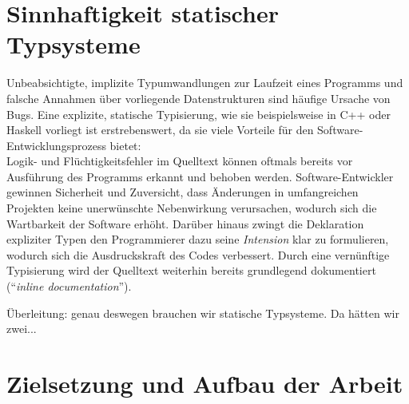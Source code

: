 


\section{Sinnhaftigkeit statischer Typsysteme}

Unbeabsichtigte, implizite Typumwandlungen zur Laufzeit eines Programms und falsche Annahmen über vorliegende Datenstrukturen sind häufige Ursache von Bugs. Eine explizite, statische Typisierung, wie sie beispielsweise in C++ oder Haskell vorliegt ist erstrebenswert, da sie viele Vorteile für den Software-Entwicklungsprozess bietet:\\
Logik- und Flüchtigkeitsfehler im Quelltext können oftmals bereits vor Ausführung des Programms erkannt und behoben werden. Software-Entwickler gewinnen Sicherheit und Zuversicht, dass Änderungen in umfangreichen Projekten keine unerwünschte Nebenwirkung verursachen, wodurch sich die Wartbarkeit der Software erhöht. Darüber hinaus zwingt die Deklaration expliziter Typen den Programmierer dazu seine \emph{Intension} klar zu formulieren, wodurch sich die Ausdruckskraft des Codes verbessert. Durch eine vernünftige Typisierung wird der Quelltext weiterhin bereits grundlegend dokumentiert (\enquote{\textit{inline documentation}}).


Überleitung: genau deswegen brauchen wir statische Typsysteme. Da hätten wir zwei...

\section{Zielsetzung und Aufbau der Arbeit}

